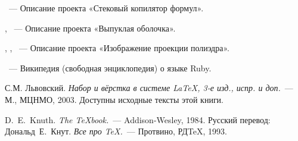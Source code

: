 \begin{thebibliography}{}

~---
Описание проекта «Стековый копилятор формул».

,
~---
Описание проекта «Выпуклая оболочка».

,
,
~---
Описание проекта «Изображение проекции полиэдра».

~---
Википедия (свободная энциклопедия) о языке Ruby.

С.М. Львовский.
{\em Набор и вёрстка в системе \LaTeX, 3-е изд., испр. и доп.}~---
М., МЦНМО, 2003. Доступны исходные тексты этой книги.

D.~E.~Knuth. {\em The \TeX{}book.}~---
Addison-Wesley, 1984. Русский перевод:
Дональд~Е.~Кнут.
{\em Все про \TeX.}~--- Протвино, РД\TeX, 1993.

\end{thebibliography}
